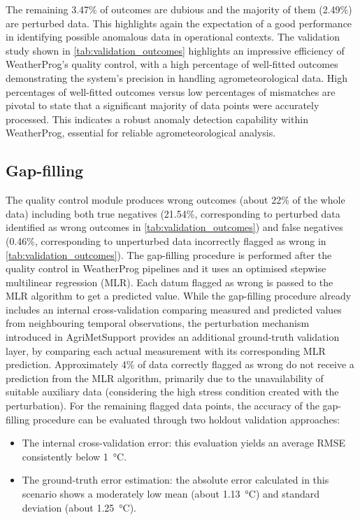 \documentclass[authoryear,preprint,review,12pt]{elsarticle}
\newcommand{\statusblock}[3]{
    \ifthenelse{\equal{#2}{todo}}
        {\textcolor{red}{#1 (TO DO): #3}}
        {}
    \ifthenelse{\equal{#2}{wip}}
        {\textcolor{magenta}{#1 (IN PROGRESS): #3}}
        {}
    \ifthenelse{\equal{#2}{update}}
        {\textcolor{blue}{#1 (UPDATE): #3}}
        {}
    \ifthenelse{\equal{#2}{review}}
        {\textcolor{cyan}{#1 (REVIEW): #3}}
        {}
    \ifthenelse{\equal{#2}{done}}
        {\textcolor{PineGreen}{#1 (READY): #3}}
        {}
}
\begin{document}
The remaining 3.47\% of outcomes are dubious and the majority of them (2.49\%) are perturbed data. This highlights again the expectation of a good performance in identifying possible anomalous data in operational contexts.
The validation study shown in \cref{tab:validation_outcomes} highlights an impressive efficiency of WeatherProg's quality control, with a high percentage of well-fitted outcomes demonstrating the system's precision in handling agrometeorological data. 
High percentages of well-fitted outcomes versus low percentages of mismatches are pivotal to state that a significant majority of data points were accurately processed. 
This indicates a robust anomaly detection capability within WeatherProg, essential for reliable agrometeorological analysis.

\subsection{Gap-filling}
The quality control module produces wrong outcomes (about 22\% of the whole data) including both true negatives (21.54\%, corresponding to perturbed data identified as wrong outcomes in \cref{tab:validation_outcomes}) and false negatives (0.46\%, corresponding to unperturbed data incorrectly flagged as wrong in \cref{tab:validation_outcomes}).
The gap-filling procedure is performed after the quality control in WeatherProg pipelines and it uses an optimised stepwise multilinear regression (MLR).
Each datum flagged as wrong is passed to the MLR algorithm to get a predicted value.
While the gap-filling procedure already includes an internal cross-validation comparing measured and predicted values from neighbouring temporal observations, the perturbation mechanism introduced in AgriMetSupport provides an additional ground-truth validation layer, 
by comparing each actual measurement with its corresponding MLR prediction. %
Approximately 4\% of data correctly flagged as wrong do not receive a prediction from the MLR algorithm, primarily due to the unavailability of suitable auxiliary data (considering the high stress condition created with the perturbation).
For the remaining flagged data points, the accuracy of the gap-filling procedure can be evaluated through two holdout validation approaches:
\begin{itemize}
    \item The internal cross-validation error: this evaluation yields an average RMSE consistently below \SI{1}{\degreeCelsius}. %
    \item The ground-truth error estimation: the absolute error calculated in this scenario shows a moderately low mean (about \SI{1.13}{\degreeCelsius}) and standard deviation (about \SI{1.25}{\degreeCelsius}). %
\end{itemize}
\end{document}

